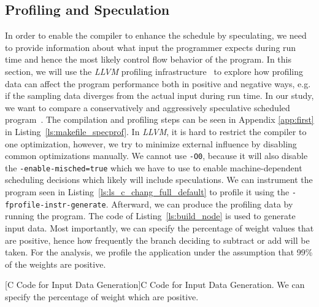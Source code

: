 \subsection{Profiling and Speculation}
In order to enable the compiler to enhance the schedule by speculating, we need to provide information about what input the programmer expects during run time and hence the most likely control flow behavior of the program. In this section, we will use the \textit{LLVM} profiling infrastructure~\cite{llvm_profdata} to explore how profiling data can affect the program performance both in positive and negative ways, e.g. if the sampling data diverges from the actual input during run time. In our study, we want to compare a conservatively and aggressively speculative scheduled program~\cite{estes2014schedmachinemodel}. The compilation and profiling steps can be seen in Appendix \ref{app:first} in Listing~\ref{ls:makefile_specprof}. In \textit{LLVM}, it is hard to restrict the compiler to one optimization, however, we try to minimize external influence by disabling common optimizations manually. We cannot use \texttt{-O0}, because it will also disable the \texttt{-enable-misched=true} which we have to use to enable machine-dependent scheduling decisions which likely will include speculations. We can instrument the program seen in Listing~\ref{ls:ls_c_chang_full_default} to profile it using the \texttt{-fprofile-instr-generate}. Afterward, we can produce the profiling data by running the program. The code of Listing~\ref{ls:build_node} is used to generate input data. Most importantly, we can specify the percentage of weight values that are positive, hence how frequently the branch deciding to subtract or add will be taken. For the analysis, we profile the application under the assumption that 99\% of the weights are positive.

\newpage
\begin{center}
        
        \captionsetup{type=Listing}
        [C Code for Input Data Generation]{C Code for Input Data Generation. We can specify the percentage of weight which are positive.}
        \label{ls:build_node}
\end{center}

